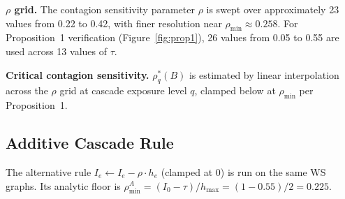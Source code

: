 \documentclass[11pt,a4paper]{article}
\begin{document}
\textbf{$\rho$ grid.} The contagion sensitivity parameter $\rho$ is swept over approximately 23 values from 0.22 to 0.42, with finer resolution near $\rho_{\min} \approx 0.258$. For Proposition~1 verification (Figure~\ref{fig:prop1}), 26 values from 0.05 to 0.55 are used across 13 values of $\tau$.

\textbf{Critical contagion sensitivity.} $\rho^*_q(B)$ is estimated by linear interpolation across the $\rho$ grid at cascade exposure level $q$, clamped below at $\rho_{\min}$ per Proposition~1.

\subsection{Additive Cascade Rule}

The alternative rule $I_e \leftarrow I_e - \rho \cdot h_e$ (clamped at 0) is run on the same WS graphs. Its analytic floor is $\rho_{\min}^A = (I_0 - \tau) / h_{\max} = (1 - 0.55)/2 = 0.225$.
\end{document}
